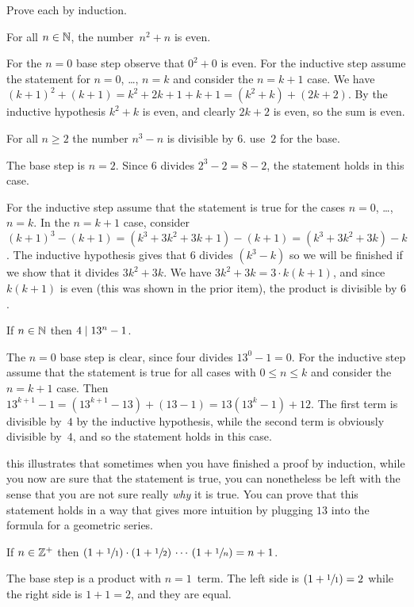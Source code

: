 \documentclass{ibl}  %
\begin{document}
\begin{problem}
Prove each by induction.
\begin{exes}
\begin{exercise}
  For all $n\in\mathbb{N}$, the number~$n^2+n$ is even.
\end{exercise}
\begin{answer}
  For the $n=0$ base step observe that $0^2+0$ is even.
  For the inductive step assume the statement for $n=0$, \ldots, $n=k$
  and consider the $n=k+1$ case.
  We have $(k+1)^2+(k+1)=k^2+2k+1+k+1=(k^2+k)+(2k+2)$. 
  By the inductive hypothesis $k^2+k$ is even, and clearly $2k+2$ is even, 
  so the sum is even.
\end{answer}
\begin{exercise} 
  For all $n\geq 2$ the number $n^3-n$ is divisible by $6$.
  \hint use~$2$ for the base.
\end{exercise}
\begin{answer}
  The base step is $n=2$.
  Since $6$ divides $2^3-2=8-2$, the statement holds in this case.

  For the inductive step assume that the statement is true for 
  the cases $n=0$, \ldots, $n=k$.
  In the $n=k+1$ case, consider 
  $(k+1)^3-(k+1)=(k^3+3k^2+3k+1)-(k+1)=(k^3+3k^2+3k)-k$.
  The inductive hypothesis gives that $6$ divides $(k^3-k)$ so we will
  be finished if we show that it divides  $3k^2+3k$.
  We have $3k^2+3k=3\cdot k(k+1)$, and since
  $k(k+1)$ is even (this was shown in the prior item),
  the product is divisible by $6$.  
\end{answer}
\begin{exercise} 
  If $n\in\mathbb{N}$ then $4\mid 13^n-1$.
\end{exercise}
\begin{answer}
  The $n=0$ base step is clear, since four divides $13^0-1=0$.
  For the inductive step assume that the statement is true for all cases 
  with $0\leq n\leq k$ and consider the $n=k+1$ case.
  Then $13^{k+1}-1=(13^{k+1}-13)+(13-1)=13(13^k-1)+12$.
  The first term is divisible by~$4$ by the inductive hypothesis, while the
  second term is obviously divisible by~$4$, and so the statement holds in 
  this case.

  \remark
  this illustrates that 
  sometimes when you have finished a proof by induction, 
  while you now are sure that the statement is true, 
  you can nonetheless be left with the sense
  that you are not sure really \emph{why} it is true.
  You can prove that this statement holds in a 
  way that gives more intuition by plugging $13$ into the formula for a
  geometric series. 
\end{answer}
\begin{exercise} 
    If $n\in\mathbb{Z}^+$ then
    $(1+\sfrac{1}{1})\cdot(1+\sfrac{1}{2})\,\cdots\,(1+\sfrac{1}{n})=n+1$.
\end{exercise}
\begin{answer}
  The base step is a product with $n=1$~term.
  The left side is $(1+\sfrac{1}{1})=2$ while the right side is $1+1=2$,
  and they are equal.


\end{answer}
\end{exes}
\end{problem}
\end{document}
